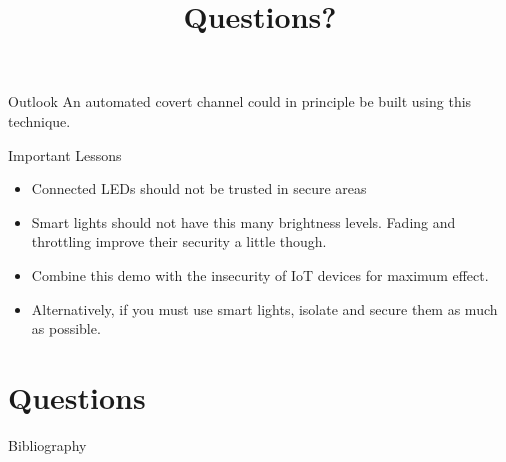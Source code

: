 \documentclass[11pt,t,usepdftitle=false,aspectratio=169]{beamer}
\begin{document}
\begin{frame}{Outlook} %
	An automated covert channel could in principle be built using this technique.

	\begin{block}{Important Lessons}
		\begin{itemize}
			\item Connected LEDs should not be trusted in secure areas
			\item Smart lights should not have this many brightness levels. Fading and throttling improve their security a little though.
			\item Combine this demo with the insecurity of IoT devices for maximum effect.
			\item Alternatively, if you must use smart lights, isolate and secure them as much as possible.
		\end{itemize}
	\end{block}

\end{frame}



\title{Questions?}
\subtitle{}
\section{Questions}


\appendix

\begin{frame}[allowframebreaks]{Bibliography}
	
	
\end{frame}
\end{document}

